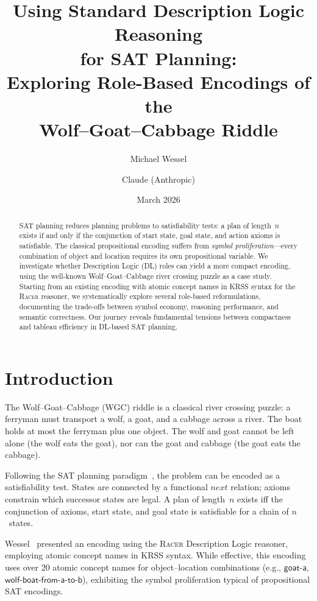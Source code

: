\documentclass[11pt,a4paper]{article}
\title{Using Standard Description Logic Reasoning\\for SAT Planning:\\
Exploring Role-Based Encodings of the\\Wolf--Goat--Cabbage Riddle}
\author{Michael Wessel \and Claude (Anthropic)}
\date{March 2026}
\newcommand{\Racer}{\textsc{Racer}}
\newcommand{\concept}[1]{\ensuremath{\mathsf{#1}}}
\newcommand{\role}[1]{\ensuremath{\mathit{#1}}}
\begin{document}
\maketitle

\begin{abstract}
SAT planning reduces planning problems to satisfiability tests: a plan
of length~$n$ exists if and only if the conjunction of start state, goal
state, and action axioms is satisfiable. The classical propositional
encoding suffers from \emph{symbol proliferation}---every combination of
object and location requires its own propositional variable. We
investigate whether Description Logic (DL) roles can yield a more
compact encoding, using the well-known Wolf--Goat--Cabbage river
crossing puzzle as a case study. Starting from an existing encoding with
atomic concept names in KRSS syntax for the \Racer{} reasoner, we
systematically explore several role-based reformulations, documenting
the trade-offs between symbol economy, reasoning performance, and
semantic correctness.  Our journey reveals fundamental tensions between
compactness and tableau efficiency in DL-based SAT planning.
\end{abstract}

\section{Introduction}
\label{sec:intro}

The Wolf--Goat--Cabbage (WGC) riddle is a classical river crossing
puzzle: a ferryman must transport a wolf, a goat, and a cabbage across a
river.  The boat holds at most the ferryman plus one object.  The wolf
and goat cannot be left alone (the wolf eats the goat), nor can the goat
and cabbage (the goat eats the cabbage).

Following the SAT planning paradigm~\cite{kautz1992}, the problem can
be encoded as a satisfiability test.  States are connected by a
functional \role{next} relation; axioms constrain which successor states
are legal.  A plan of length~$n$ exists iff the conjunction of axioms,
start state, and goal state is satisfiable for a chain of $n$~states.

Wessel~\cite{wessel2014} presented an encoding using the \Racer{}
Description Logic reasoner, employing atomic concept names in KRSS
syntax.  While effective, this encoding uses over 20 atomic concept names
for object--location combinations (e.g., \concept{goat\text{-}a},
\concept{wolf\text{-}boat\text{-}from\text{-}a\text{-}to\text{-}b}),
exhibiting the symbol proliferation typical of propositional SAT
encodings.
\end{document}
